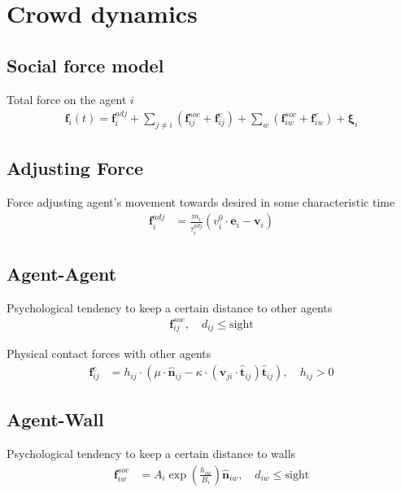 \section{Crowd dynamics}
\subsection{Social force model}
Total force on the agent $ i $
\begin{align}
\mathbf{f}_{i}(t) = \mathbf{f}_{i}^{adj} + \sum_{j\neq i}^{} \left(\mathbf{f}_{ij}^{soc} + \mathbf{f}_{ij}^{c}\right) + \sum_{w}^{} \left(\mathbf{f}_{iw}^{soc} + \mathbf{f}_{iw}^{c}\right) + \boldsymbol{\xi}_{i}
\end{align}


\subsection{Adjusting Force}
Force adjusting agent's movement towards desired in some characteristic time \begin{align}
\mathbf{f}_{i}^{adj} &= \frac{m_{i}}{\tau_{i}^{adj}} (v_{i}^{0} \cdot \hat{\mathbf{e}}_{i} - \mathbf{v}_{i}) 
\end{align}


\subsection{Agent-Agent}
Psychological tendency to keep a certain distance to other agents
\begin{align}
\mathbf{f}_{ij}^{soc}, \quad  d_{ij} \leq \text{sight} 
\end{align}

Physical contact forces with other agents 
\begin{align}
\mathbf{f}_{ij}^{c} &= h_{ij} \cdot \left(\mu \cdot \hat{\mathbf{n}}_{ij} - \kappa \cdot \left(\mathbf{v}_{ji} \cdot \hat{\mathbf{t}}_{ij}\right) \hat{\mathbf{t}}_{ij}\right), \quad h_{ij} > 0
\end{align}


\subsection{Agent-Wall}
Psychological tendency to keep a certain distance to walls
\begin{align}
\mathbf{f}_{iw}^{soc} &= A_{i} \exp\left(\frac{h_{iw}}{B_{i}}\right) \hat{\mathbf{n}}_{iw}, \quad  d_{iw} \leq \text{sight}
\end{align} 

